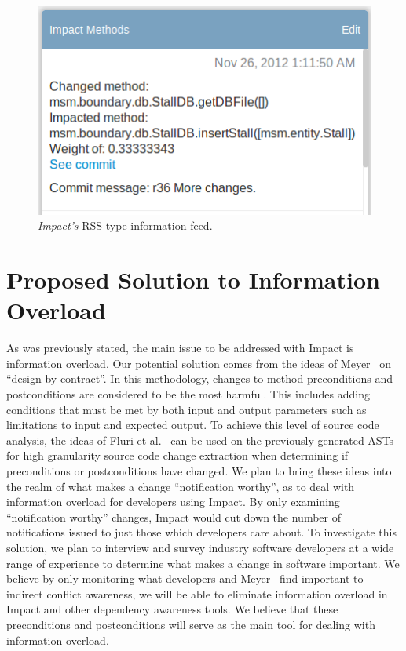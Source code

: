 \documentclass[conference]{IEEEtran}
\begin{document}
\begin{figure}[t!]
\includegraphics[width=\columnwidth]{images/ImpactDemo}
\caption{\textit{Impact's} RSS type information feed.\label{fig:impact}}
\end{figure}

\section{Proposed Solution to Information Overload}
\label{sec:ns}
As was previously stated, the main issue to be addressed with Impact is
information overload. Our potential solution comes from the ideas of
Meyer~\cite{Meyer:1988} on ``design by contract''. In this methodology, changes to method
preconditions and postconditions are considered to be the most harmful. 
This includes adding conditions that must be met by both input
and output parameters such as limitations to input and expected
output. To achieve this level of source code analysis, the ideas of
Fluri et al.~\cite{Fluri:2007:CDT} can be used on the previously generated
ASTs for high granularity
source code change extraction when determining if preconditions or
postconditions have changed.
We plan to bring these ideas into the realm of what makes a
change ``notification worthy'', as to deal with information overload for
developers using Impact. By only examining ``notification worthy'' changes,
Impact would cut down the number of notifications 
issued to just those which developers care about. To investigate this solution, we plan to
interview and survey industry software developers at a wide range of
experience to determine what makes a change in software important. We believe
by only monitoring what developers and Meyer~\cite{Meyer:1988} find important to
indirect conflict awareness, we will be able to eliminate information overload
in Impact and other dependency awareness tools. We believe that these preconditions
and postconditions will serve as the main tool for dealing with information overload.
\end{document}
